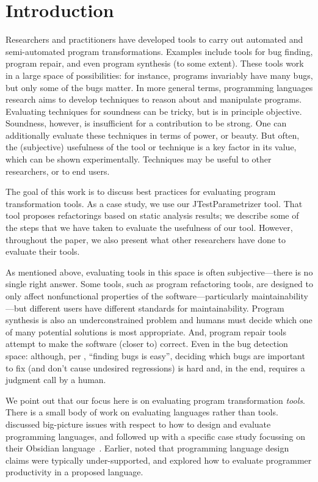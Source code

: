 \section{Introduction}
Researchers and practitioners have developed tools to carry out
automated and semi-automated program transformations.  Examples
include tools for bug finding, program repair, and even 
program synthesis (to some extent). These tools work in a large space of possibilities:
for instance, programs invariably have many bugs, but only some of the bugs
matter.
In more general terms, programming languages research aims to develop
techniques to reason about and manipulate programs. Evaluating
techniques for soundness can be tricky, but is in principle
objective. Soundness, however, is insufficient for a contribution to
be strong. One can additionally evaluate these techniques in terms of
power, or beauty. But often, the (subjective) usefulness of the tool or technique
is a key factor in its value, which can be shown
experimentally. Techniques may be useful to other researchers, or to
end users.

The goal of this work is to discuss best practices for evaluating
program transformation tools. As a case study, we use our
JTestParametrizer tool. That tool proposes
refactorings based on static analysis results; we describe some of the
steps that we have taken to evaluate the usefulness of our tool. However,
throughout the paper, we also present what other researchers have done to evaluate their tools.

As mentioned above, evaluating tools in this space is often subjective---there is no
single right answer. Some tools, such as program refactoring tools,
are designed to only affect nonfunctional properties of the
software---particularly maintainability---but different users have
different standards for maintainability. Program synthesis is also an
underconstrained problem and humans must decide which one of many
potential solutions is most appropriate. And, program repair
tools attempt to make the software (closer to) correct. Even in 
the bug detection space: although, per 
, ``finding bugs is
easy'', deciding which bugs are
important to fix (and don't cause undesired regressions) is hard and,
in the end, requires a judgment call by a human.

We point out that our focus here is on evaluating program transformation \emph{tools}.
There is a small body of work on evaluating languages rather than tools.
discussed big-picture issues with respect to how to design and evaluate programming languages, and followed up with a specific case study focussing on their Obsidian
language~\cite{coblenz20:_can_advan_type_system_be_usabl}.
Earlier,  noted that programming 
language design claims were typically under-supported, and  explored how to evaluate programmer productivity in a
proposed language. 

